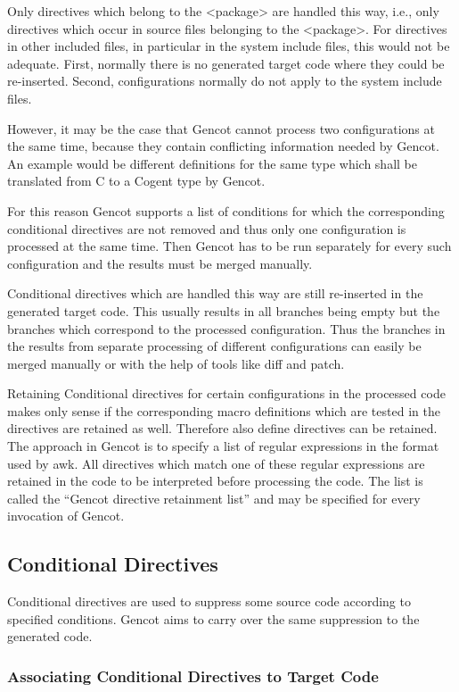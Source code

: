 Only directives which belong to the <package> are handled this way, i.e., only directives which occur in source
files belonging to the <package>. For directives in other included files, in particular in the system include files,
this would not be adequate. First, normally there is no generated target code where they could be re-inserted.
Second, configurations normally do not apply to the system include files.

However, it may be the case that Gencot cannot process two configurations at the same time, because they contain
conflicting information needed by Gencot. An example would be different definitions for the same type which
shall be translated from C to a Cogent type by Gencot.

For this reason Gencot supports a list of conditions for which the corresponding conditional directives are not 
removed and thus only one configuration is processed at the same time. Then Gencot has to be run separately for every
such configuration and the results must be merged manually.

Conditional directives which are handled this way are still re-inserted in the generated target code. This
usually results in all branches being empty but the branches which correspond to the processed configuration.
Thus the branches in the results from separate processing of different configurations can easily be merged manually
or with the help of tools like diff and patch.

Retaining Conditional directives for certain configurations in the processed code makes only sense if the corresponding
macro definitions which are tested in the directives are retained as well. Therefore also define directives can be
retained. The approach in Gencot is to specify a list of regular expressions in the format used by awk. All directives
which match one of these regular expressions are retained in the code to be interpreted before processing the code.
The list is called the ``Gencot directive retainment list'' and may be specified for every invocation of Gencot.

\subsection{Conditional Directives}

Conditional directives are used to suppress some source code according to specified conditions. Gencot aims to
carry over the same suppression to the generated code.

\subsubsection{Associating Conditional Directives to Target Code}

